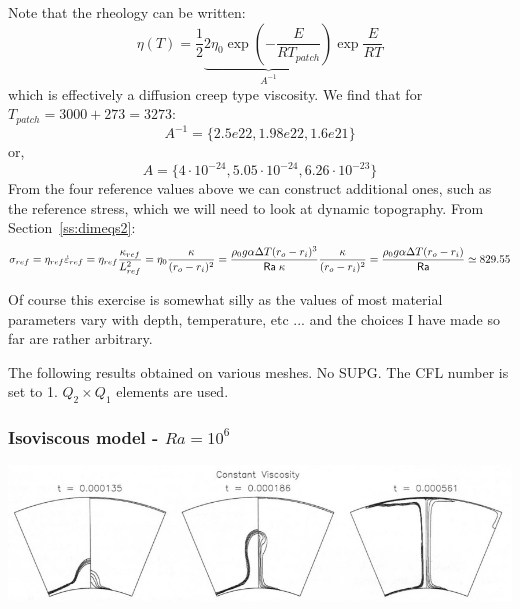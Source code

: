 Note that the rheology can be written:
\[
\eta(T)  
= \frac12 \underbrace{2 \eta_0  \exp\left( -\frac{E}{R T_{patch}} \right) }_{A^{-1}} \exp \frac{E}{R T}  
\]
which is effectively a diffusion creep type viscosity.
We find that for $T_{patch}=3000+273=3273$: 
\[
A^{-1} = \{ 2.5e22, 1.98e22 , 1.6e21 \}
\]
or, 
\[
A = \{ 4\cdot 10^{-24}    , 5.05\cdot 10^{-24}   ,  6.26\cdot 10^{-23}\} 
\]
From the four reference values above we can construct additional ones, 
such as the reference stress, which we will need to look at dynamic topography.
From Section~\ref{ss:dimeqs2}:
\[
\sigma_{ref} 
= \eta_{ref} \dot{\varepsilon}_{ref} 
= \eta_{ref} \frac{\kappa_{ref}}{L^2_{ref}} 
= \eta_0 \frac{\kappa }{ (r_o-r_i)^2}
= \frac{\rho_0 g \alpha \Delta T (r_o-r_i)^3}{{\mathsf{Ra}} \; \kappa} \frac{\kappa}{(r_o-r_i)^2}
= \frac{\rho_0 g \alpha \Delta T (r_o-r_i)}{{\mathsf{Ra}}}
\simeq 829.55  
\] 




Of course this exercise is somewhat silly as the values of most material parameters
vary with depth, temperature, etc ... and the choices I have made so far are rather arbitrary.

The following results obtained on various meshes. 
No SUPG. The CFL number is set to 1. 
$Q_2\times Q_1$ elements are used. 

\newpage
\subsubsection*{Isoviscous model - $Ra=10^6$}

\begin{center}
\includegraphics[width=15cm]{python_codes/fieldstone_106/images/keki97b}
\end{center}


